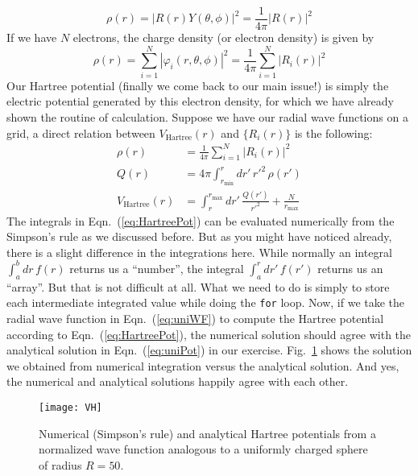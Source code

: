 \begin{equation} \label{eq:chargeR}
\rho(r) = |R(r)Y(\theta,\phi)|^2 = \frac{1}{4\pi}|R(r)|^2
\end{equation}
%
If we have $N$ electrons, the charge density (or electron density) is given by
\begin{equation} \label{eq:eleDens}
\rho(r) = \sum_{i=1}^N|\varphi_i(r,\theta,\phi)|^2 = \frac{1}{4\pi} \sum_{i=1}^N|R_i(r)|^2
\end{equation}
%
Our Hartree potential (finally we come back to our main issue!) is simply the
electric potential generated by this electron density, for which we have already
shown the routine of calculation. Suppose we have our radial wave functions on
a grid, a direct relation between $V_{\text{Hartree}}(r)$ and $\{R_i(r)\}$ is
the following:
\begin{equation}
\boxed{
\begin{aligned}
\rho(r)               & =  \frac{1}{4\pi} \sum_{i=1}^N|R_i(r)|^2 \\
Q(r)                  & = 4\pi \int_{r_{\text{min}}}^r dr'\,r'^2 \, \rho(r') \label{eq:HartreePot} \\
V_{\text{Hartree}}(r) & = \int_r^{r_{\text{max}}} dr'\, \frac{Q(r')}{r'^2} + \frac{N}{r_{\text{max}}}
\end{aligned}
}
\end{equation}
%
The integrals in Eqn.~(\ref{eq:HartreePot}) can be evaluated numerically
from the Simpson's rule as we discussed before. But as you might have noticed already,
there is a slight difference in the integrations here. While normally an
integral $\int_a^b dr\, f(r)$ returns us a ``number'', the integral
$\int_a^r dr'\, f(r')$ returns us an ``array''. But that is not difficult at all.
What we need to do is simply to store each intermediate integrated value
while doing the \texttt{for} loop.
Now, if we take the radial wave function in Eqn.~(\ref{eq:uniWF}) to compute the Hartree
potential according to Eqn.~(\ref{eq:HartreePot}), the numerical solution
should agree with the analytical solution in Eqn.~(\ref{eq:uniPot}) in our exercise.
Fig.~\ref{fig:VH} shows the solution we obtained from numerical integration versus the
analytical solution. And yes, the numerical and analytical solutions happily agree with each other.

\begin{figure}[h!]
\centering
  \texttt{[image: VH]}
  \caption{Numerical (Simpson's rule) and analytical Hartree potentials
           from a normalized wave function
           analogous to a uniformly charged sphere of radius $R=50$.}
  \label{fig:VH}
\end{figure}


